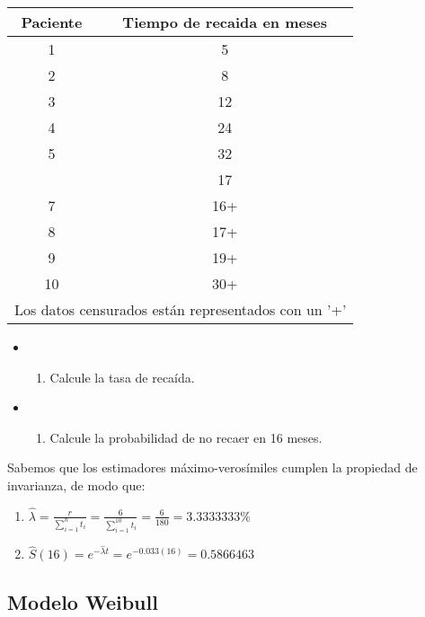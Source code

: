 \documentclass[
  a4paper,
  oneside,
  openany]{book}
\providecommand{\tightlist}{%
  \setlength{\itemsep}{0pt}\setlength{\parskip}{0pt}}
\begin{document}
\begin{table}
\centering
\begin{tabular}{cc}
\toprule
Paciente & Tiempo de recaida en meses\\
\midrule
1 & 5\\
2 & 8\\
3 & 12\\
4 & 24\\
5 & 32\\
\addlinespace
6 & 17\\
7 & 16+\\
8 & 17+\\
9 & 19+\\
10 & 30+\\
\bottomrule
\multicolumn{2}{l}{\rule{0pt}{1em}Los datos censurados están representados con un '+'}\\
\end{tabular}
\end{table}

\begin{itemize}
\item
  \begin{enumerate}
  \def\labelenumi{\alph{enumi})}
  \tightlist
  \item
    Calcule la tasa de recaída.
  \end{enumerate}
\item
  \begin{enumerate}
  \def\labelenumi{\alph{enumi})}
  \setcounter{enumi}{1}
  \tightlist
  \item
    Calcule la probabilidad de no recaer en 16 meses.
  \end{enumerate}
\end{itemize}

Sabemos que los estimadores máximo-verosímiles cumplen la propiedad de invarianza, de modo que:

\begin{enumerate}
\def\labelenumi{\alph{enumi})}
\item
  \(\hat{\lambda} = \frac{r}{\sum_{i= 1}^{n}t_{i}} = \frac{6}{\sum_{i= 1}^{10}t_{i}} = \frac{6}{180} = 3.3333333\%\)
\item
  \(\hat S(16) = e^{-\hat\lambda t} = e^{-0.033(16)} = 0.5866463\)
\end{enumerate}

\hypertarget{modelo-weibull-1}{%
\subsection*{Modelo Weibull}\label{modelo-weibull-1}}
\end{document}
